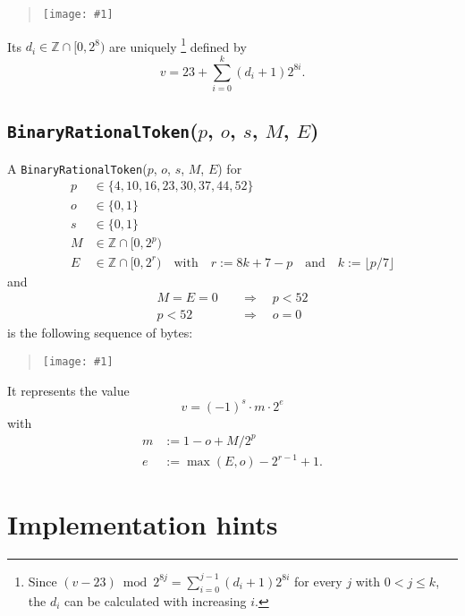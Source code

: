 \documentclass[headings=normal, headsepline, numbers=noenddot, fleqn, a4paper]{scrartcl}
\let\mathbbm\mathds
\newcommand{\SetOfIntegers}{\mathbbm{Z}}
\newcommand{\DborSyntaxIdent}[1]{\texttt{#1}}
\newcommand{\IncludeImageInPlace}[1]{%
    \begin{quotation}%
        \texttt{[image: \#1]}%
    \end{quotation}%
}
\begin{document}
    \IncludeImageInPlace{IntegerTokenB.pdf}

    Its $d_i \in \SetOfIntegers \cap [0, 2^8)$ are uniquely%
    \footnote{%
        Since $(v - 23) \bmod 2^{8 j} = \sum_{i = 0}^{j - 1} (d_i + 1) 2^{8 i}$ for every $j$ with $0 < j \le k$,
        the $d_i$ can be calculated with increasing $i$.
    }
    defined by 
    \begin{equation}
        v = 23 + \sum_{i = 0}^k (d_i + 1) 2^{8 i}.
    \end{equation}

    
    \subsection{\DborSyntaxIdent{BinaryRationalToken}($p$, $o$, $s$, $M$, $E$)}
    \hypertarget{sec:def:BinaryRationalToken}{}

    A \DborSyntaxIdent{BinaryRationalToken}($p$, $o$, $s$, $M$, $E$) for
    \begin{align*}
        p & \in \{4, 10, 16, 23, 30, 37, 44, 52\} \\
        o & \in \{0, 1\} \\
        s & \in \{0, 1\} \\
        M & \in \SetOfIntegers \cap [0, 2^p) \\
        E & \in \SetOfIntegers \cap [0, 2^r)
            \quad\text{with}\quad r := 8 k + 7 - p
            \quad\text{and}\quad k := \lfloor p / 7 \rfloor
    \end{align*}%
    and
    \begin{align*}
        M = E = 0 \quad & \Rightarrow \quad p < 52 \\
        p < 52 \quad & \Rightarrow \quad o = 0
    \end{align*}%
    is the following sequence of bytes:

    \IncludeImageInPlace{BinaryRationalToken.pdf}

    It represents the value
    \begin{equation}
        v = (-1)^s \cdot m \cdot 2^e
    \end{equation}
    with
    \begin{align*}
        m & := 1 - o + M / 2^p \\
        e & := \max(E, o) - 2^{r-1} + 1.
    \end{align*}

    \section{Implementation hints}
    \label{sec:implementation}
\end{document}
